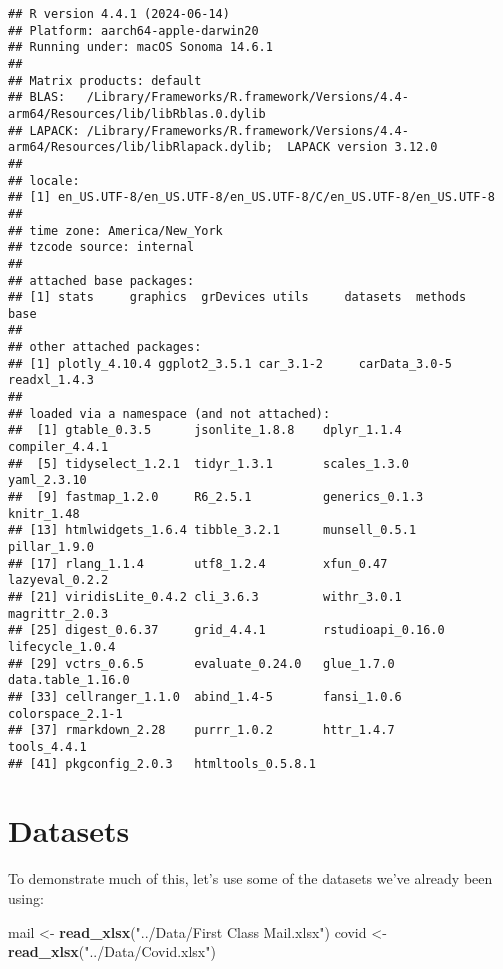 \documentclass[
]{article}
\newenvironment{Shaded}{\begin{snugshade}}{\end{snugshade}}
\newcommand{\FunctionTok}[1]{\textcolor[rgb]{0.13,0.29,0.53}{\textbf{#1}}}
\newcommand{\NormalTok}[1]{#1}
\newcommand{\OtherTok}[1]{\textcolor[rgb]{0.56,0.35,0.01}{#1}}
\newcommand{\StringTok}[1]{\textcolor[rgb]{0.31,0.60,0.02}{#1}}
\begin{document}
\begin{verbatim}
## R version 4.4.1 (2024-06-14)
## Platform: aarch64-apple-darwin20
## Running under: macOS Sonoma 14.6.1
## 
## Matrix products: default
## BLAS:   /Library/Frameworks/R.framework/Versions/4.4-arm64/Resources/lib/libRblas.0.dylib 
## LAPACK: /Library/Frameworks/R.framework/Versions/4.4-arm64/Resources/lib/libRlapack.dylib;  LAPACK version 3.12.0
## 
## locale:
## [1] en_US.UTF-8/en_US.UTF-8/en_US.UTF-8/C/en_US.UTF-8/en_US.UTF-8
## 
## time zone: America/New_York
## tzcode source: internal
## 
## attached base packages:
## [1] stats     graphics  grDevices utils     datasets  methods   base     
## 
## other attached packages:
## [1] plotly_4.10.4 ggplot2_3.5.1 car_3.1-2     carData_3.0-5 readxl_1.4.3 
## 
## loaded via a namespace (and not attached):
##  [1] gtable_0.3.5      jsonlite_1.8.8    dplyr_1.1.4       compiler_4.4.1   
##  [5] tidyselect_1.2.1  tidyr_1.3.1       scales_1.3.0      yaml_2.3.10      
##  [9] fastmap_1.2.0     R6_2.5.1          generics_0.1.3    knitr_1.48       
## [13] htmlwidgets_1.6.4 tibble_3.2.1      munsell_0.5.1     pillar_1.9.0     
## [17] rlang_1.1.4       utf8_1.2.4        xfun_0.47         lazyeval_0.2.2   
## [21] viridisLite_0.4.2 cli_3.6.3         withr_3.0.1       magrittr_2.0.3   
## [25] digest_0.6.37     grid_4.4.1        rstudioapi_0.16.0 lifecycle_1.0.4  
## [29] vctrs_0.6.5       evaluate_0.24.0   glue_1.7.0        data.table_1.16.0
## [33] cellranger_1.1.0  abind_1.4-5       fansi_1.0.6       colorspace_2.1-1 
## [37] rmarkdown_2.28    purrr_1.0.2       httr_1.4.7        tools_4.4.1      
## [41] pkgconfig_2.0.3   htmltools_0.5.8.1
\end{verbatim}

\section{Datasets}\label{datasets}

To demonstrate much of this, let's use some of the datasets we've
already been using:

\begin{Shaded}
\begin{Highlighting}[]
\NormalTok{mail }\OtherTok{\textless{}{-}} \FunctionTok{read\_xlsx}\NormalTok{(}\StringTok{"../Data/First Class Mail.xlsx"}\NormalTok{)}
\NormalTok{covid }\OtherTok{\textless{}{-}} \FunctionTok{read\_xlsx}\NormalTok{(}\StringTok{"../Data/Covid.xlsx"}\NormalTok{)}
\end{Highlighting}
\end{Shaded}
\end{document}
